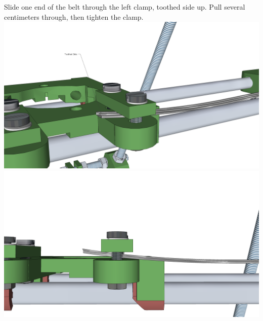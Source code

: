 \documentclass[twoside,a4paper,titlepage]{memoir}
\begin{document}
	\section{}
	Slide one end of the belt through the left clamp, toothed side up. Pull several centimeters through, then
	tighten the clamp.\\
	\includegraphics[width=1\linewidth]{graphics/ch9_14_1.png}
	\includegraphics[width=1\linewidth]{graphics/ch9_14_2.png}
	
\end{document}
